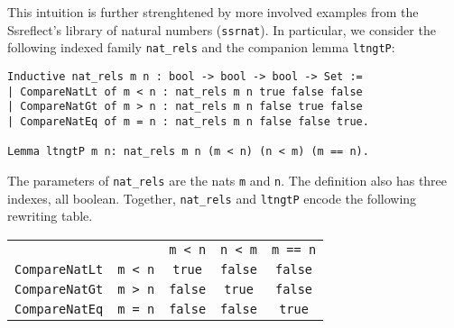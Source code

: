 \documentclass[blockstyle,preprint,nocopyrightspace]{sigplanconf}
\newcommand{\code}[1]{\lstinline{#1}}
\begin{document}
This intuition is further strenghtened by more involved examples from
the Ssreflect's library of natural numbers (\code{ssrnat}). In
particular, we consider the following indexed family \code{nat_rels}
and the companion lemma \code{ltngtP}:

\begin{lstlisting}
Inductive nat_rels m n : bool -> bool -> bool -> Set :=
| CompareNatLt of m < n : nat_rels m n true false false
| CompareNatGt of m > n : nat_rels m n false true false
| CompareNatEq of m = n : nat_rels m n false false true.

Lemma ltngtP m n: nat_rels m n (m < n) (n < m) (m == n).
\end{lstlisting}

\noindent
The parameters of \code{nat_rels} are the nats \code{m} and
\code{n}. The definition also has three indexes, all boolean.
Together, \code{nat_rels} and \code{ltngtP} encode the following
rewriting table.

\vspace{5pt}

\begin{center}
\hspace{-20pt}
  \begin{tabular}{r|r|c|c|c|}
    \cline{3-5}
    \multicolumn{2}{c|}{} & \code{m < n} & \code{n < m} & \code{m == n}
    \\
    \cline{2-5}
    \multicolumn{1}{r}{\code{CompareNatLt}}& \multicolumn{1}{|c||}{\code{m < n}} & \code{true} & \code{false} & \code{false}
    \\
    \cline{2-5}
    \multicolumn{1}{r}{\code{CompareNatGt}}& \multicolumn{1}{|c||}{\code{m > n}} & \code{false} & \code{true} & \code{false}
    \\
    \cline{2-5}
    \multicolumn{1}{r}{\code{CompareNatEq}}& \multicolumn{1}{|c||}{\code{m = n}} & \code{false} & \code{false} & \code{true}
    \\
    \cline{2-5}
  \end{tabular}
\end{center}
\end{document}
